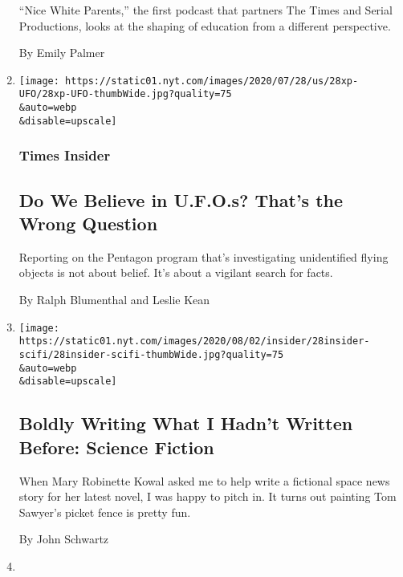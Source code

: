 \begin{enumerate}
  ``Nice White Parents,'' the first podcast that partners The Times and
  Serial Productions, looks at the shaping of education from a different
  perspective.

  By Emily Palmer
\item
  \href{/2020/07/28/insider/UFO-reporting.html}{}

  \texttt{[image: https://static01.nyt.com/images/2020/07/28/us/28xp-UFO/28xp-UFO-thumbWide.jpg?quality=75\\\&auto=webp\\\&disable=upscale]}

  \hypertarget{times-insider-4}{%
  \subsubsection{Times Insider}\label{times-insider-4}}

  \hypertarget{do-we-believe-in-ufos-thats-the-wrong-question}{%
  \subsection{Do We Believe in U.F.O.s? That's the Wrong
  Question}\label{do-we-believe-in-ufos-thats-the-wrong-question}}

  Reporting on the Pentagon program that's investigating unidentified
  flying objects is not about belief. It's about a vigilant search for
  facts.

  By Ralph Blumenthal and Leslie Kean
\item
  \href{/2020/07/28/insider/science-fiction-novel-mary-robinette-kowal.html}{}

  \texttt{[image: https://static01.nyt.com/images/2020/08/02/insider/28insider-scifi/28insider-scifi-thumbWide.jpg?quality=75\\\&auto=webp\\\&disable=upscale]}

  \hypertarget{boldly-writing-what-i-hadnt-written-before-science-fiction}{%
  \subsection{Boldly Writing What I Hadn't Written Before: Science
  Fiction}\label{boldly-writing-what-i-hadnt-written-before-science-fiction}}

  When Mary Robinette Kowal asked me to help write a fictional space
  news story for her latest novel, I was happy to pitch in. It turns out
  painting Tom Sawyer's picket fence is pretty fun.

  By John Schwartz
\item
  \href{/2020/07/24/insider/international-journalists-meeting.html}{}


\end{enumerate}
